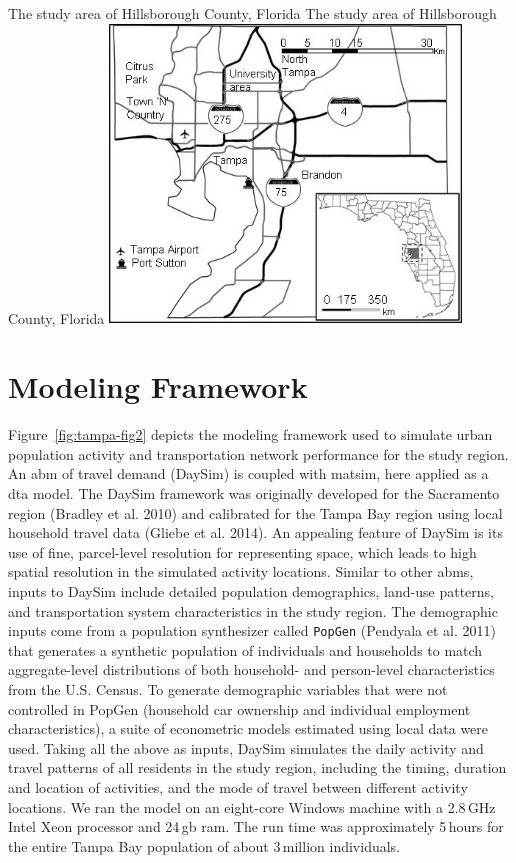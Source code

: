 \createfigure%
{The study area of Hillsborough County, Florida}%
{The study area of Hillsborough County, Florida}%
{\label{fig:tampa-fig1}}%
{\includegraphics[width=0.7\textwidth, angle=0]{./scenarios/figures/tampa-fig1.jpg}}%
{}

\section{Modeling Framework}
Figure~\ref{fig:tampa-fig2} depicts the modeling framework used to simulate urban population activity and transportation network performance for the study region. 
An \gls{abm} of travel demand (DaySim) is coupled with \gls{matsim}, here applied as a \gls{dta} model. 
The DaySim framework was originally developed for the Sacramento region \citep[][]{}(Bradley et al. 2010) and calibrated for the Tampa Bay region using local household travel data \citep[][]{}(Gliebe et al. 2014). 
An appealing feature of DaySim is its use of fine, parcel-level resolution for representing space, which leads to high spatial resolution in the simulated activity locations.  
Similar to other \glspl{abm}, inputs to DaySim include detailed population demographics, land-use patterns, and transportation system characteristics in the study region. The demographic inputs come from a population synthesizer called \lstinline|PopGen| \citep[][]{}(Pendyala et al. 2011) that generates a synthetic population of individuals and households to match aggregate-level distributions of both household- and person-level characteristics from the U.S. Census. 
To generate demographic variables that were not controlled in PopGen (\eg household car ownership and individual employment characteristics), a suite of econometric models estimated using local data were used. 
Taking all the above as inputs, DaySim simulates the daily activity and travel patterns of all residents in the study region, including the timing, duration and location of activities, and the mode of travel between different activity locations. 
We ran the model on an eight-core Windows machine with a 2.8\,GHz Intel Xeon processor and 24\,\gls{gb} \gls{ram}. 
The run time was approximately 5\,hours for the entire Tampa Bay population of about 3\,million individuals.

